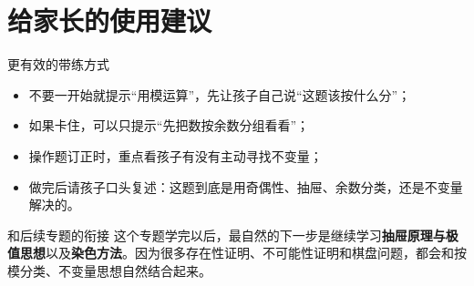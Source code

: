 \documentclass[11pt,a4paper,fontset=fandol]{ctexart}
\begin{document}
\section{给家长的使用建议}

\begin{warnbox}{更有效的带练方式}
\begin{itemize}
  \item 不要一开始就提示“用模运算”，先让孩子自己说“这题该按什么分”；
  \item 如果卡住，可以只提示“先把数按余数分组看看”；
  \item 操作题订正时，重点看孩子有没有主动寻找不变量；
  \item 做完后请孩子口头复述：这题到底是用奇偶性、抽屉、余数分类，还是不变量解决的。
\end{itemize}
\end{warnbox}

\begin{infobox}{和后续专题的衔接}
这个专题学完以后，最自然的下一步是继续学习\textbf{抽屉原理与极值思想}以及\textbf{染色方法}。因为很多存在性证明、不可能性证明和棋盘问题，都会和按模分类、不变量思想自然结合起来。
\end{infobox}
\end{document}
